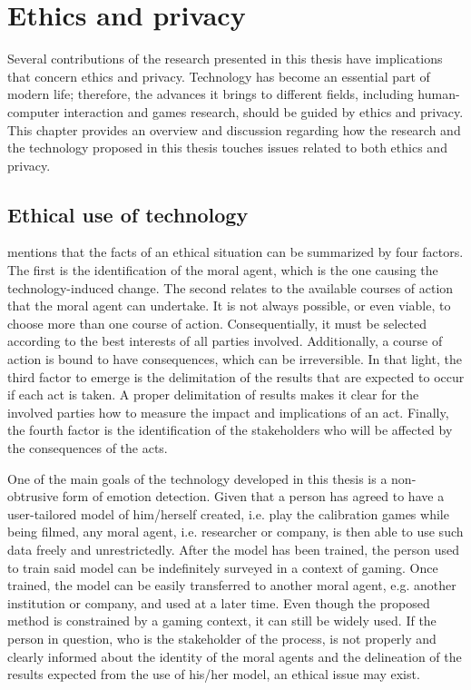 \chapter{Ethics and privacy}
\label{ch:ethics}

Several contributions of the research presented in this thesis have implications that concern ethics and privacy. Technology has become an essential part of modern life; therefore, the advances it brings to different fields, including human-computer interaction and games research, should be guided by ethics and privacy. This chapter provides an overview and discussion regarding how the research and the technology proposed in this thesis touches issues related to both ethics and privacy.

\section{Ethical use of technology}
\label{sec:ethics-ethical}

\textcite{mason1995applying} mentions that the facts of an ethical situation can be summarized by four factors. The first is the identification of the moral agent, which is the one causing the technology-induced change. The second relates to the available courses of action that the moral agent can undertake. It is not always possible, or even viable, to choose more than one course of action. Consequentially, it must be selected according to the best interests of all parties involved. Additionally, a course of action is bound to have consequences, which can be irreversible. In that light, the third factor to emerge is the delimitation of the results that are expected to occur if each act is taken. A proper delimitation of results makes it clear for the involved parties how to measure the impact and implications of an act. Finally, the fourth factor is the identification of the stakeholders who will be affected by the consequences of the acts.

One of the main goals of the technology developed in this thesis is a non-obtrusive form of emotion detection. Given that a person has agreed to have a user-tailored model of him/herself created, i.e. play the calibration games while being filmed, any moral agent, i.e. researcher or company, is then able to use such data freely and unrestrictedly. After the model has been trained, the person used to train said model can be indefinitely surveyed in a context of gaming. Once trained, the model can be easily transferred to another moral agent, e.g. another institution or company, and used at a later time. Even though the proposed method is constrained by a gaming context, it can still be widely used. If the person in question, who is the stakeholder of the process, is not properly and clearly informed about the identity of the moral agents and the delineation of the results expected from the use of his/her model, an ethical issue may exist.

